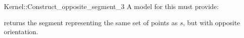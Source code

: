 \begin{ccRefFunctionObjectConcept}{Kernel::Construct_opposite_segment_3}
A model for this must provide:


{returns the segment representing the same set of points as $s$,
but with opposite orientation.}

\end{ccRefFunctionObjectConcept}
